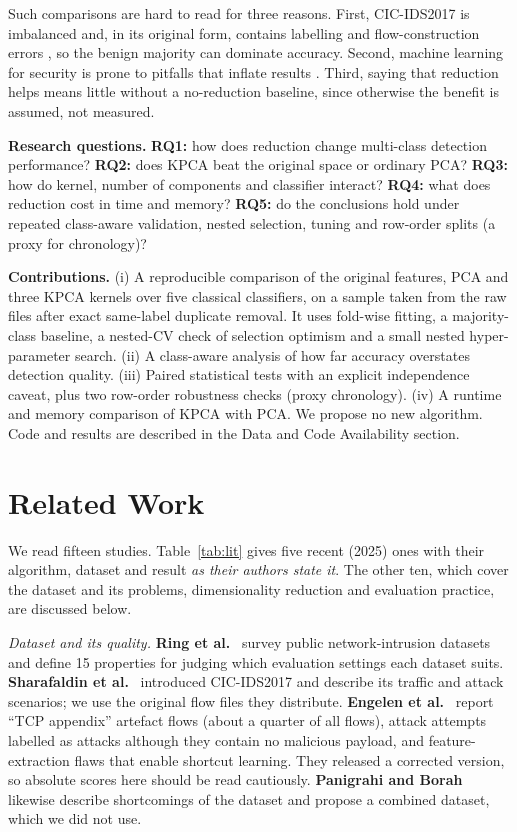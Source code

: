 \documentclass[runningheads]{llncs}
\begin{document}
Such comparisons are hard to read for three reasons. First, CIC-IDS2017 is imbalanced and, in its original form, contains labelling and flow-construction errors \cite{engelen2021,panigrahi2018}, so the benign majority can dominate accuracy. Second, machine learning for security is prone to pitfalls that inflate results \cite{arp2022}. Third, saying that reduction helps means little without a no-reduction baseline, since otherwise the benefit is assumed, not measured.

\textbf{Research questions.} \textbf{RQ1:} how does reduction change multi-class detection performance? \textbf{RQ2:} does KPCA beat the original space or ordinary PCA? \textbf{RQ3:} how do kernel, number of components and classifier interact? \textbf{RQ4:} what does reduction cost in time and memory? \textbf{RQ5:} do the conclusions hold under repeated class-aware validation, nested selection, tuning and row-order splits (a proxy for chronology)?

\textbf{Contributions.} (i) A reproducible comparison of the original features, PCA and three KPCA kernels over five classical classifiers, on a sample taken from the raw files after exact same-label duplicate removal. It uses fold-wise fitting, a majority-class baseline, a nested-CV check of selection optimism and a small nested hyper-parameter search. (ii) A class-aware analysis of how far accuracy overstates detection quality. (iii) Paired statistical tests with an explicit independence caveat, plus two row-order robustness checks (proxy chronology). (iv) A runtime and memory comparison of KPCA with PCA. We propose no new algorithm. Code and results are described in the Data and Code Availability section.

\section{Related Work}
We read fifteen studies. Table~\ref{tab:lit} gives five recent (2025) ones with their algorithm, dataset and result \emph{as their authors state it}. The other ten, which cover the dataset and its problems, dimensionality reduction and evaluation practice, are discussed below.




\textit{Dataset and its quality.} \textbf{Ring et al.}~\cite{ring2019} survey public network-intrusion datasets and define 15 properties for judging which evaluation settings each dataset suits. \textbf{Sharafaldin et al.}~\cite{sharafaldin2018} introduced CIC-IDS2017 and describe its traffic and attack scenarios; we use the original flow files they distribute. \textbf{Engelen et al.}~\cite{engelen2021} report ``TCP appendix'' artefact flows (about a quarter of all flows), attack attempts labelled as attacks although they contain no malicious payload, and feature-extraction flaws that enable shortcut learning. They released a corrected version, so absolute scores here should be read cautiously. \textbf{Panigrahi and Borah}~\cite{panigrahi2018} likewise describe shortcomings of the dataset and propose a combined dataset, which we did not use.
\end{document}
